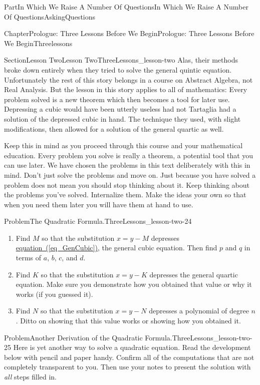 \documentclass[oneside,10pt,]{book}
\newcommand{\xreffont}{\relax}
\numberwithin{equation}{part}
\begin{document}
\begin{partptx}{Part}{In Which We Raise A Number Of Questions}{}{In Which We Raise A Number Of Questions}{}{}{AskingQuestions}
\begin{chapterptx}{Chapter}{Prologue: Three Lessons Before We Begin}{}{Prologue: Three Lessons Before We Begin}{}{}{Threelessons}
\begin{sectionptx}{Section}{Lesson Two}{}{Lesson Two}{}{}{ThreeLessons_lesson-two}
Alas, their methods broke down entirely when they tried to solve the general quintic equation.  Unfortunately the rest of this story belongs in a course on Abstract Algebra, not Real Analysis.  But the lesson in this story applies to all of mathematics: Every problem solved is a new theorem which then becomes a tool for later use.  Depressing a cubic would have been utterly useless had not Tartaglia had a solution of the depressed cubic in hand.  The technique they used, with slight modifications, then allowed for a solution of the general quartic as well.%
\par
Keep this in mind as you proceed through this course and your mathematical education.  Every problem you solve is really a theorem, a potential tool that you can use later.  We have chosen the problems in this text deliberately with this in mind. Don't just solve the problems and move on.  Just because you have solved a problem does not mean you should stop thinking about it.  Keep thinking about the problems you've solved. Internalize them.  Make the ideas your own so that when you need them later you will have them at hand to use.%
\begin{problem}{Problem}{The Quadratic Formula.}{ThreeLessons_lesson-two-24}%
%
\begin{enumerate}[label={(\alph*)}]
\item{}Find \(M\) so that the substitution \(x=y-M\) depresses \hyperref[eq_GenCubic]{equation~({\xreffont\ref{eq_GenCubic}})}, the general cubic equation.  Then find \(p\) and \(q\) in terms of \(a\), \(b\), \(c\), and \(d\).%
\item{}Find \(K\) so that the substitution \(x=y-K\) depresses the general quartic equation.  Make sure you demonstrate how you obtained that value or why it works (if you guessed it).%
\item{}Find \(N\) so that the substitution \(x=y-N\) depresses a polynomial of degree \(n\).  Ditto on showing that this value works or showing how you obtained it.%
\end{enumerate}
%
\end{problem}
\begin{problem}{Problem}{Another Derivation of the Quadratic Formula.}{ThreeLessons_lesson-two-25}%
 Here is yet another way to solve a quadratic equation.  Read the development below with pencil and paper handy.  Confirm all of the computations that are not completely transparent to you.  Then use your notes to present the solution with \emph{all} steps filled in.%

\end{problem}
\end{sectionptx}
\end{chapterptx}
\end{partptx}
\end{document}
